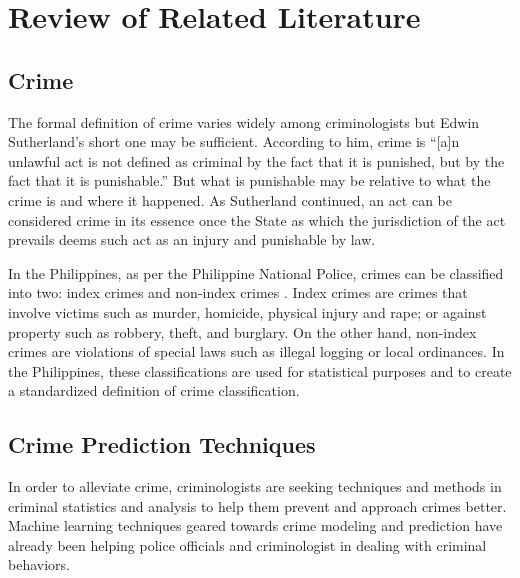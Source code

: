 \chapter{Review of Related Literature}
\section{Crime}
    The formal definition of crime varies widely among criminologists but Edwin Sutherland’s short one may be sufficient. According to him, crime is “[a]n unlawful act is not defined as criminal by the fact that it is punished, but by the fact that it is punishable.” \citep{brown2010criminology} But what is punishable may be relative to what the crime is and where it happened. As Sutherland continued, an act can be considered crime in its essence once the State as which the jurisdiction of the act prevails deems such act as an injury and punishable by law.

    In the Philippines, as per the Philippine National Police, crimes can be classified into two: index crimes and non-index crimes \citep{senate2013criminal}. Index crimes are crimes that involve victims such as murder, homicide, physical injury and rape; or against property such as robbery, theft, and burglary. On the other hand, non-index crimes are violations of special laws such as illegal logging or local ordinances. In the Philippines, these classifications are used for statistical purposes and to create a standardized definition of crime classification\citep{tumulak2015crime}.

\section{Crime Prediction Techniques}
    In order to alleviate crime, criminologists are seeking techniques and methods in criminal statistics and analysis to help them prevent and approach crimes better. Machine learning techniques geared towards crime modeling and prediction have already been helping police officials and criminologist in dealing with criminal behaviors.

